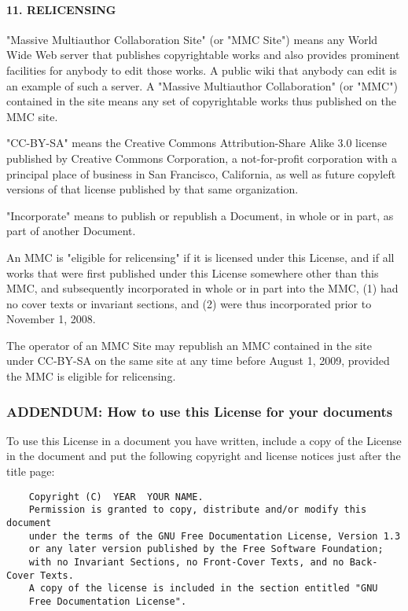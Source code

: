 \hypertarget{11-relicensing}{%
\paragraph{11. RELICENSING}\label{11-relicensing}}

"Massive Multiauthor Collaboration Site" (or "MMC Site") means any World
Wide Web server that publishes copyrightable works and also provides
prominent facilities for anybody to edit those works. A public wiki that
anybody can edit is an example of such a server. A "Massive Multiauthor
Collaboration" (or "MMC") contained in the site means any set of
copyrightable works thus published on the MMC site.

"CC-BY-SA" means the Creative Commons Attribution-Share Alike 3.0
license published by Creative Commons Corporation, a not-for-profit
corporation with a principal place of business in San Francisco,
California, as well as future copyleft versions of that license
published by that same organization.

"Incorporate" means to publish or republish a Document, in whole or in
part, as part of another Document.

An MMC is "eligible for relicensing" if it is licensed under this
License, and if all works that were first published under this License
somewhere other than this MMC, and subsequently incorporated in whole or
in part into the MMC, (1) had no cover texts or invariant sections, and
(2) were thus incorporated prior to November 1, 2008.

The operator of an MMC Site may republish an MMC contained in the site
under CC-BY-SA on the same site at any time before August 1, 2009,
provided the MMC is eligible for relicensing.

\hypertarget{addendum-how-to-use-this-license-for-your-documents}{%
\subsubsection{ADDENDUM: How to use this License for your
documents}\label{addendum-how-to-use-this-license-for-your-documents}}

To use this License in a document you have written, include a copy of
the License in the document and put the following copyright and license
notices just after the title page:

\begin{verbatim}
    Copyright (C)  YEAR  YOUR NAME.
    Permission is granted to copy, distribute and/or modify this document
    under the terms of the GNU Free Documentation License, Version 1.3
    or any later version published by the Free Software Foundation;
    with no Invariant Sections, no Front-Cover Texts, and no Back-Cover Texts.
    A copy of the license is included in the section entitled "GNU
    Free Documentation License".
\end{verbatim}

